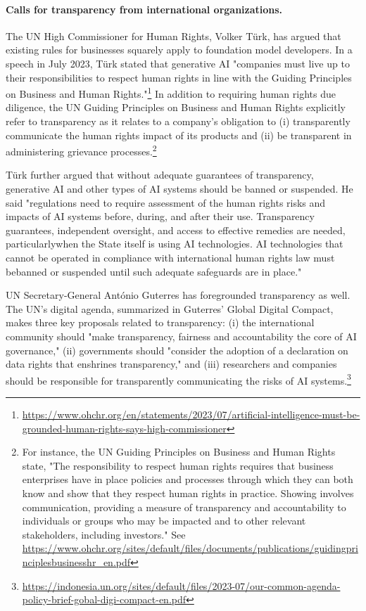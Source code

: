 \documentclass[screen, authorversion, acmsmall]{acmart}
\begin{document}
\paragraph{\textbf{Calls for transparency from international organizations.}}
The UN High Commissioner for Human Rights, Volker Türk, has argued that existing rules for businesses squarely apply to foundation model developers. 
In a speech in July 2023, Türk stated that generative AI "companies must live up to their responsibilities to respect human rights in line with the Guiding Principles on Business and Human Rights."\footnote{\url{https://www.ohchr.org/en/statements/2023/07/artificial-intelligence-must-be-grounded-human-rights-says-high-commissioner}}
In addition to requiring human rights due diligence, the UN Guiding Principles on Business and Human Rights explicitly refer to transparency as it relates to a company's obligation to (i) transparently communicate the human rights impact of its products and (ii) be transparent in administering grievance processes.\footnote{For instance, the UN Guiding Principles on Business and Human Rights state, "The responsibility to respect human rights requires that business enterprises have in place policies and processes through which they can both know and show that they respect human rights in practice. Showing involves communication, providing a measure of transparency and accountability to individuals or groups who may be impacted and to other relevant stakeholders, including investors." See \url{https://www.ohchr.org/sites/default/files/documents/publications/guidingprinciplesbusinesshr_en.pdf}}

Türk further argued that without adequate guarantees of transparency, generative AI and other types of AI systems should be banned or suspended.
He said "regulations need to require assessment of the human rights risks and impacts of AI systems before, during, and after their use. Transparency guarantees, independent oversight, and access to effective remedies are needed, particularlywhen the State itself is using AI technologies. AI technologies that cannot be operated in compliance with international human rights law must bebanned or suspended until such adequate safeguards are in place."

UN Secretary-General António Guterres has foregrounded transparency as well. 
The UN's digital agenda, summarized in Guterres' Global Digital Compact, makes three key proposals related to transparency: (i) the international community should "make transparency, fairness and accountability the core of AI governance," (ii) governments should "consider the adoption of a declaration on data rights that enshrines transparency," and (iii) researchers and companies should be responsible for transparently communicating the risks of AI systems.\footnote{\url{https://indonesia.un.org/sites/default/files/2023-07/our-common-agenda-policy-brief-gobal-digi-compact-en.pdf}}
\end{document}
